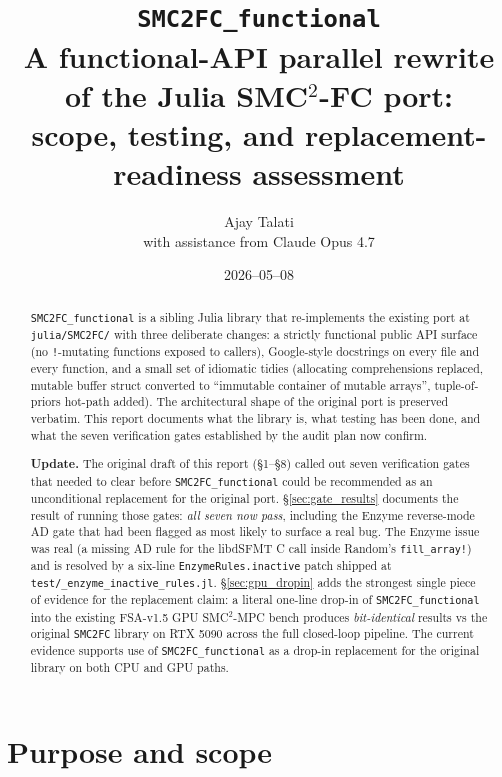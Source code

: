 \documentclass[11pt,a4paper]{article}
\title{\textbf{\texttt{SMC2FC\_functional}} \\
        \large A functional-API parallel rewrite of the Julia SMC$^2$-FC port: \\
        scope, testing, and replacement-readiness assessment}
\author{Ajay Talati \\ \small with assistance from Claude Opus 4.7}
\date{2026--05--08}
\begin{document}
\sloppy
\maketitle

\begin{abstract}
\texttt{SMC2FC\_functional} is a sibling Julia library that re-implements the
existing port at \texttt{julia/SMC2FC/} with three deliberate changes: a
strictly functional public API surface (no \texttt{!}-mutating functions
exposed to callers), Google-style docstrings on every file and every
function, and a small set of idiomatic tidies (allocating comprehensions
replaced, mutable buffer struct converted to ``immutable container of
mutable arrays'', tuple-of-priors hot-path added). The architectural
shape of the original port is preserved verbatim. This report documents
what the library is, what testing has been done, and what the seven
verification gates established by the audit plan now confirm.

\textbf{Update.} The original draft of this report (\S 1--\S 8) called
out seven verification gates that needed to clear before
\texttt{SMC2FC\_functional} could be recommended as an unconditional
replacement for the original port. \S\ref{sec:gate_results} documents
the result of running those gates: \emph{all seven now pass}, including
the Enzyme reverse-mode AD gate that had been flagged as most likely to
surface a real bug. The Enzyme issue was real (a missing AD rule for
the libdSFMT C call inside Random's \texttt{fill\_array!}) and is
resolved by a six-line \texttt{EnzymeRules.inactive} patch shipped at
\texttt{test/\_enzyme\_inactive\_rules.jl}. \S\ref{sec:gpu_dropin} adds
the strongest single piece of evidence for the replacement claim: a
literal one-line drop-in of \texttt{SMC2FC\_functional} into the
existing FSA-v1.5 GPU SMC$^2$-MPC bench produces \emph{bit-identical}
results vs the original \texttt{SMC2FC} library on RTX 5090 across the
full closed-loop pipeline. The current evidence supports use of
\texttt{SMC2FC\_functional} as a drop-in replacement for the original
library on both CPU and GPU paths.
\end{abstract}

\section{Purpose and scope}
\end{document}
